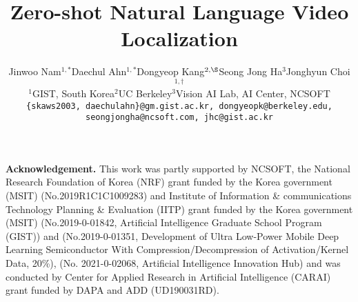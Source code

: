 \documentclass[10pt,twocolumn,letterpaper]{article}
\begin{document}
\title{Zero-shot Natural Language Video Localization}


\author{Jinwoo Nam$^{1,*}$\hspace{1.5em}Daechul Ahn$^{1,*}$\hspace{1.5em}Dongyeop Kang$^{2,\S}$\hspace{1.5em}Seong Jong Ha$^{3}$\hspace{1.5em}Jonghyun Choi$^{1,\dagger}$\vspace{0.3em}\\
{\hspace{2em}$^1$GIST, South Korea\hspace{6em}$^2$UC Berkeley\hspace{2.5em}$^3$Vision AI Lab, AI Center, NCSOFT}\\
{\tt\footnotesize \{skaws2003, daechulahn\}@gm.gist.ac.kr, dongyeopk@berkeley.edu, seongjongha@ncsoft.com, jhc@gist.ac.kr}}

\maketitle
\ificcvfinal\thispagestyle{empty}\fi



\vspace{0.5em}
{
\footnotesize
\noindent
\textbf{Acknowledgement.} This work was partly supported by NCSOFT, the National Research Foundation of Korea (NRF) grant funded by the Korea government (MSIT) (No.2019R1C1C1009283) and Institute of Information \& communications Technology Planning \& Evaluation (IITP) grant funded by the Korea government (MSIT) (No.2019-0-01842, Artificial Intelligence Graduate School Program (GIST)) and (No.2019-0-01351, Development of Ultra Low-Power Mobile Deep Learning Semiconductor With Compression/Decompression of Activation/Kernel Data, 20\%), (No. 2021-0-02068, Artificial Intelligence Innovation Hub) and was conducted by Center for Applied Research in Artificial Intelligence (CARAI) grant funded by DAPA and ADD (UD190031RD).\par
}

{\small


}
\end{document}

